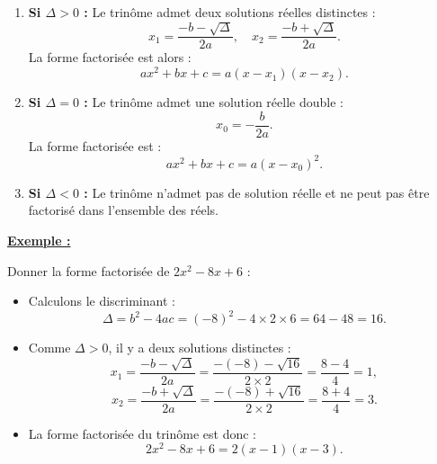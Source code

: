 \documentclass[12pt]{article}
\newcounter{solution}
\begin{document}
\begin{enumerate}
    \item \textbf{Si \( \Delta > 0 \) :}  
    Le trinôme admet deux solutions réelles distinctes :
    \[
    x_1 = \frac{-b - \sqrt{\Delta}}{2a}, \quad x_2 = \frac{-b + \sqrt{\Delta}}{2a}.
    \]
    La forme factorisée est alors :
    \[
    ax^2 + bx + c = a(x - x_1)(x - x_2).
    \]

    \item \textbf{Si \( \Delta = 0 \) :}  
    Le trinôme admet une solution réelle double :
    \[
    x_0 = -\frac{b}{2a}.
    \]
    La forme factorisée est :
    \[
    ax^2 + bx + c = a(x - x_0)^2.
    \]

    \item \textbf{Si \( \Delta < 0 \) :}  
    Le trinôme n’admet pas de solution réelle et ne peut pas être factorisé dans l’ensemble des réels.
\end{enumerate}

\textbf{\underline{Exemple :}}  

Donner la forme factorisée de  \( 2x^2 - 8x + 6  \) :

\begin{itemize}
    \item Calculons le discriminant :
    \[
    \Delta = b^2 - 4ac = (-8)^2 - 4 \times 2 \times 6 = 64 - 48 = 16.
    \]
    \item Comme \( \Delta > 0 \), il y a deux solutions distinctes :
    \[
    x_1 = \frac{-b - \sqrt{\Delta}}{2a} = \frac{-(-8) - \sqrt{16}}{2 \times 2} = \frac{8 - 4}{4} = 1,
    \]
    \[
    x_2 = \frac{-b + \sqrt{\Delta}}{2a} = \frac{-(-8) + \sqrt{16}}{2 \times 2} = \frac{8 + 4}{4} = 3.
    \]
    \item La forme factorisée du trinôme est donc :
    \[
    2x^2 - 8x + 6 = 2(x - 1)(x - 3).
    \]
\end{itemize}
\end{document}

